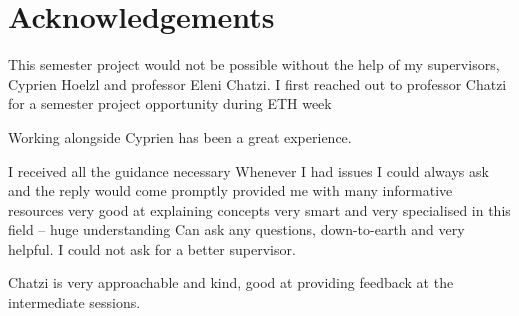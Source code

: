 \newpage
\chapter*{Acknowledgements}
This semester project would not be possible without the help of my supervisors, Cyprien Hoelzl and professor Eleni Chatzi. I first reached out to professor Chatzi for a semester project opportunity during ETH week 

Working alongside Cyprien has been a great experience.

I received all the guidance necessary
Whenever I had issues I could always ask and the reply would come promptly
provided me with many informative resources
very good at explaining concepts
very smart
and very specialised in this field -- huge understanding
Can ask any questions, down-to-earth and very helpful. I could not ask for a better supervisor. 

Chatzi is very approachable and kind, good at providing feedback at the intermediate sessions.





\newpage


